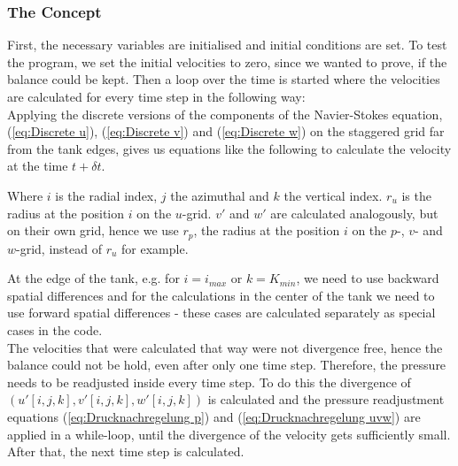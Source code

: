\documentclass[12pt, a4paper]{article} %
\begin{document}
		\subsubsection{The Concept}
			
			First, the necessary variables are initialised and initial conditions are set. To test the program, we set the initial velocities to zero, since we wanted to prove, if the balance could be kept.
			Then a loop over the time is started where the velocities are calculated for every time step in the following way:\\
			
			Applying the discrete versions of the components of the Navier-Stokes equation, (\ref{eq:Discrete u}), (\ref{eq:Discrete v}) and (\ref{eq:Discrete w}) on the staggered grid far from the tank edges, gives us equations like the following to calculate the velocity at the time $t + \delta t$.
			
			
			Where $i$ is the radial index, $j$ the azimuthal and $k$ the vertical index. $r_u$ is the radius at the position $i$ on the $u$-grid. $v'$ and $w'$ are calculated analogously, but on their own grid, hence we use $r_p$, the radius at the position $i$ on the $p$-, $v$- and $w$-grid, instead of $r_u$ for example.
			
			At the edge of the tank, e.g. for $i=i_{max}$ or $k=K_{min}$, we need to use backward spatial differences and for the calculations in the center of the tank we need to use forward spatial differences - these cases are calculated separately as special cases in the code.\\
			
			The velocities that were calculated that way were not divergence free, hence the balance could not be hold, even after only one time step. Therefore, the pressure needs to be readjusted inside every time step. To do this the divergence of $\left(u'[i,j,k], v'[i,j,k], w'[i,j,k]\right)$ is calculated and the pressure readjustment equations (\ref{eq:Drucknachregelung p}) and (\ref{eq:Drucknachregelung uvw}) are applied in a while-loop, until the divergence of the velocity gets sufficiently small.
			After that, the next time step is calculated.
			
\end{document}

